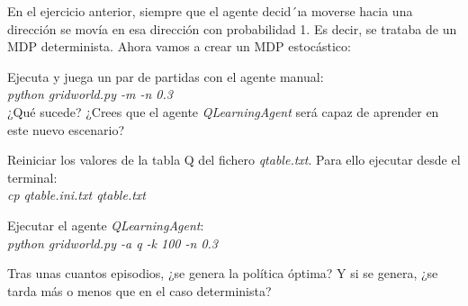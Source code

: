 \documentclass[11pt]{exam}
\begin{document}
En el ejercicio anterior, siempre que el agente decid´ıa moverse hacia una dirección se movía en esa dirección con probabilidad 1. Es decir, se trataba de un MDP determinista. Ahora vamos a crear un MDP estocástico:

\begin{questions}

{ \question Ejecuta y juega un par de partidas con el agente manual: \\ \textit{python gridworld.py -m -n 0.3} \\ ¿Qué sucede? ¿Crees que el agente \textit{QLearningAgent} será capaz de aprender en este nuevo escenario?
}

{ \question Reiniciar los valores de la tabla Q del fichero \textit{qtable.txt}. Para ello ejecutar desde el terminal: \\ \textit{cp qtable.ini.txt qtable.txt}
}

{ \question Ejecutar el agente \textit{QLearningAgent}: \\ \textit{python gridworld.py -a q -k 100 -n 0.3}}

{ \question Tras unas cuantos episodios, ¿se genera la política óptima? Y si se genera, ¿se tarda más o menos que en el caso determinista?
}

\end{questions}
\end{document}
